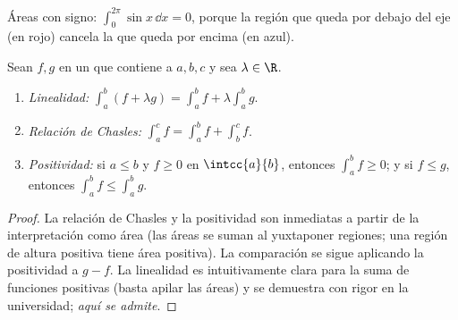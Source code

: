 \begin{omfigure}

{\small Áreas con signo: $\int_0^{2\pi} \sin x\,\dd x = 0$, porque la región
que queda por debajo del eje (en rojo) cancela la que queda por encima (en
azul).}
\end{omfigure}

\begin{proposition}\label{prop:g12:integ:properties}
Sean $f, g$  en un  que contiene a $a, b, c$ y sea
$\lambda \in \R$.
\begin{enumerate}
  \item \emph{Linealidad:}
        $\displaystyle\int_a^b (f + \lambda g) = \int_a^b f + \lambda \int_a^b g$.
  \item \emph{Relación de Chasles:}
        $\displaystyle\int_a^c f = \int_a^b f + \int_b^c f$.
  \item \emph{Positividad:} si $a \leq b$ y $f \geq 0$ en $\intcc{a}{b}$,
        entonces $\displaystyle\int_a^b f \geq 0$; y si $f \leq g$,
        entonces $\displaystyle\int_a^b f \leq \int_a^b g$.
\end{enumerate}
\end{proposition}

\begin{proof}
La relación de Chasles y la positividad son inmediatas a partir de la
interpretación como área (las áreas se suman al yuxtaponer regiones; una
región de altura positiva tiene área positiva). La comparación se sigue
aplicando la positividad a $g - f$. La linealidad es intuitivamente clara
para la suma de funciones positivas (basta apilar las áreas) y se demuestra
con rigor en la universidad; \emph{aquí se admite}.
\end{proof}

